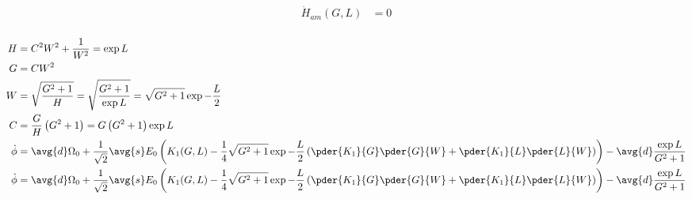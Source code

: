 \begin{equation}
\begin{split}
 \dot{H}_{am}(G,L) &=  0 \\
\end{split}
\end{equation}

\begin{equation}
\begin{split}
H &= C^2 W^2 + \frac{1}{W^2} = \exp{L}\\
G &= C W^2\\
W &= \sqrt{\frac{G^2+1}{H}} = \sqrt{\frac{G^2+1}{\exp{L}}} = \sqrt{G^2+1}\exp{-\frac{L}{2}}\\
C & = \frac{G}{H} \left(G^2+1\right) = G\left(G^2+1\right) \exp{L}\\
\dot{\phi} &= \avg{d} \Omega_0  + \frac{1}{\sqrt{2}} \avg{s} E_0 \left(K_1(G,L) - \frac{1}{4} \sqrt{G^2+1}\exp{-\frac{L}{2}} \left(\pder{K_1}{G}\pder{G}{W} + \pder{K_1}{L} \pder{L}{W}\right)\right) - \avg{d} \frac{\exp{L}}{G^2+1} \\
\dot{\phi} &= \avg{d} \Omega_0  + \frac{1}{\sqrt{2}} \avg{s} E_0 \left(K_1(G,L) - \frac{1}{4} \sqrt{G^2+1}\exp{-\frac{L}{2}} \left(\pder{K_1}{G}\pder{G}{W} + \pder{K_1}{L} \pder{L}{W}\right)\right) - \avg{d} \frac{\exp{L}}{G^2+1} \\
\end{split}
\end{equation}



